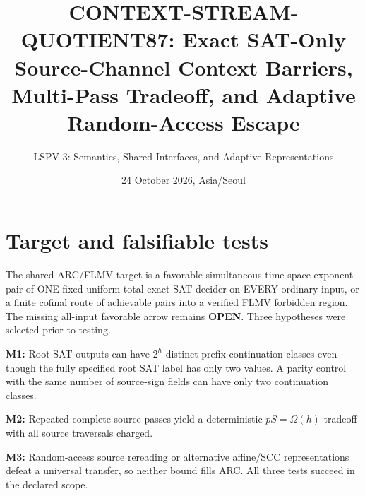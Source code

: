 \documentclass[11pt]{article}
\title{CONTEXT-STREAM-QUOTIENT87: Exact SAT-Only Source-Channel Context Barriers, Multi-Pass Tradeoff, and Adaptive Random-Access Escape}
\author{LSPV-3: Semantics, Shared Interfaces, and Adaptive Representations}
\date{24 October 2026, Asia/Seoul}
\newcommand{\OPEN}{\textbf{OPEN}}
\begin{document}
\maketitle
\begin{center}\end{center}

\section{Target and falsifiable tests}
The shared ARC/FLMV target is a favorable simultaneous time-space exponent pair of ONE fixed uniform total exact SAT decider on EVERY ordinary input, or a finite cofinal route of achievable pairs into a verified FLMV forbidden region. The missing all-input favorable arrow remains \OPEN. Three hypotheses were selected prior to testing.
\par\noindent\textbf{M1:} Root SAT outputs can have $2^h$ distinct prefix continuation classes even though the fully specified root SAT label has only two values. A parity control with the same number of source-sign fields can have only two continuation classes.
\par\noindent\textbf{M2:} Repeated complete source passes yield a deterministic $pS=\Omega(h)$ tradeoff with all source traversals charged.
\par\noindent\textbf{M3:} Random-access source rereading or alternative affine/SCC representations defeat a universal transfer, so neither bound fills ARC. All three tests succeed in the declared scope.
\end{document}
